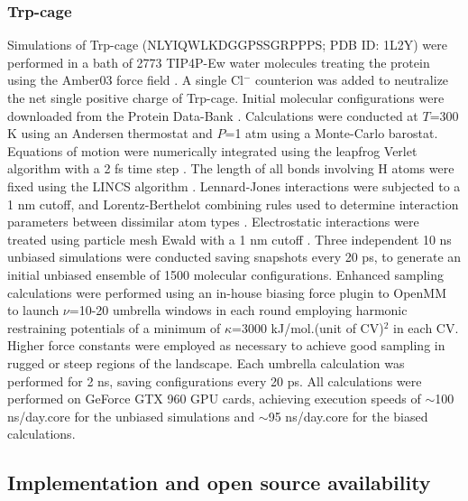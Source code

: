 \documentclass[12pt]{article}
\begin{document}
\subsubsection{\sffamily \normalsize Trp-cage} \label{sec:methTrp}

Simulations of Trp-cage (NLYIQWLKDGGPSSGRPPPS; PDB ID: 1L2Y) were performed in a bath of 2773 TIP4P-Ew water molecules \cite{horn2004development} treating the protein using the Amber03 force field \cite{wang2004development}. A single Cl$^-$ counterion was added to neutralize the net single positive charge of Trp-cage. Initial molecular configurations were downloaded from the Protein Data-Bank \cite{neidigh2002designing,berman2002protein}. Calculations were conducted at $T$=300 K using an Andersen thermostat \cite{andersen1980molecular} and $P$=1 atm using a Monte-Carlo barostat\cite{chow1995isothermal,aaqvist2004molecular}. Equations of motion were numerically integrated using the leapfrog Verlet algorithm with a 2 fs time step \cite{hockney1988computer}. The length of all bonds involving H atoms were fixed using the LINCS algorithm \cite{hess1997lincs}. Lennard-Jones interactions were subjected to a 1 nm cutoff, and Lorentz-Berthelot combining rules used to determine interaction parameters between dissimilar atom types \cite{allenoxford}. Electrostatic interactions were treated using particle mesh Ewald with a 1 nm cutoff \cite{darden1993particle}. Three independent 10 ns unbiased simulations were conducted saving snapshots every 20 ps, to generate an initial unbiased ensemble of 1500 molecular configurations. Enhanced sampling calculations were performed using an in-house biasing force plugin to OpenMM to launch $\nu$=10-20 umbrella windows in each round employing harmonic restraining potentials of a minimum of $\kappa$=3000 kJ/mol.(unit of CV)$^2$ in each CV. Higher force constants were employed as necessary to achieve good sampling in rugged or steep regions of the landscape. Each umbrella calculation was performed for 2 ns, saving configurations every 20 ps. All calculations were performed on GeForce GTX 960 GPU cards, achieving execution speeds of $\sim$100 ns/day.core for the unbiased simulations and $\sim$95 ns/day.core for the biased calculations.




\subsection{\sffamily \large Implementation and open source availability}\label{implementation}
\end{document}
